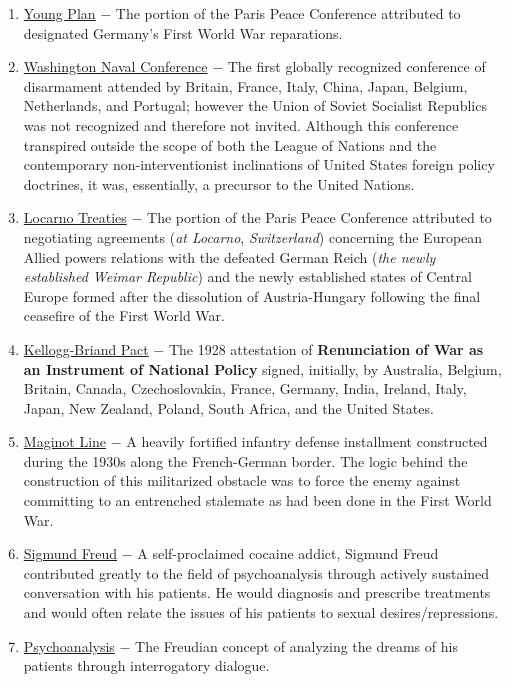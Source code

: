 \documentclass[12pt]{article}
\begin{document}
\begin{flushleft}
\begin{enumerate}
\item \underline{Young Plan} $-$ The portion of the Paris Peace Conference attributed to designated Germany's First World War reparations.

\item \underline{Washington Naval Conference} $-$ The first globally recognized conference of disarmament attended by Britain, France, Italy, China, Japan, Belgium, Netherlands, and Portugal; however the Union of Soviet Socialist Republics was not recognized and therefore not invited. Although this conference transpired outside the scope of both the League of Nations and the contemporary non-interventionist inclinations of United States foreign policy doctrines, it was, essentially, a precursor to the United Nations. 

\item \underline{Locarno Treaties} $-$ The portion of the Paris Peace Conference attributed to negotiating agreements (\emph{at Locarno}, \emph{Switzerland}) concerning the European Allied powers relations with the defeated German Reich (\emph{the newly established Weimar Republic}) and the newly established states of Central Europe formed after the dissolution of Austria-Hungary following the final ceasefire of the First World War.

\item \underline{Kellogg-Briand Pact} $-$ The 1928 attestation of \textbf{Renunciation of War as an Instrument of National Policy} signed, initially, by Australia, Belgium, Britain, Canada, Czechoslovakia, France, Germany, India, Ireland, Italy, Japan, New Zealand, Poland, South Africa, and the United States.

\item \underline{Maginot Line} $-$ A heavily fortified infantry defense installment constructed during the 1930s along the French-German border. The logic behind the construction of this militarized obstacle was to force the enemy against committing to an entrenched stalemate as had been done in the First World War.

\item \underline{Sigmund Freud} $-$ A self-proclaimed cocaine addict, Sigmund Freud contributed greatly to the field of psychoanalysis through actively sustained conversation with his patients. He would diagnosis and prescribe treatments and would often relate the issues of his patients to sexual desires/repressions.

\item \underline{Psychoanalysis} $-$ The Freudian concept of analyzing the dreams of his patients through interrogatory dialogue.


\end{enumerate}
\end{flushleft}
\end{document}

